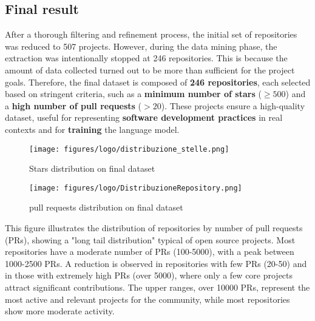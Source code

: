 \subsection{Final result}
After a thorough filtering and refinement process, the initial set of repositories was reduced to 507 projects. However, during the data mining phase, the extraction was intentionally stopped at 246 repositories. This is because the amount of data collected turned out to be more than sufficient for the project goals. Therefore, the final dataset is composed of \textbf{246 repositories}, each selected based on stringent criteria, such as a \textbf{minimum number of stars} (\( \geq 500 \)) and a \textbf{high number of pull requests} (\( > 20 \)).
These projects ensure a high-quality dataset, useful for representing \textbf{software development practices} in real contexts and for \textbf{training} the language model.
\begin{figure}[H]
    \centering
        \texttt{[image: figures/logo/distribuzione\_stelle.png]}
        \caption{Stars distribution on final dataset}       
\end{figure}
\begin{figure}[H]
    \centering
        \texttt{[image: figures/logo/DistribuzioneRepository.png]}
        \caption{pull requests distribution on final dataset}       
\end{figure}
This figure illustrates the distribution of repositories by number of pull requests (PRs), showing a "long tail distribution" typical of open source projects. Most repositories have a moderate number of PRs (100-5000), with a peak between 1000-2500 PRs. A reduction is observed in repositories with few PRs (20-50) and in those with extremely high PRs (over 5000), where only a few core projects attract significant contributions. The upper ranges, over 10000 PRs, represent the most active and relevant projects for the community, while most repositories show more moderate activity.
